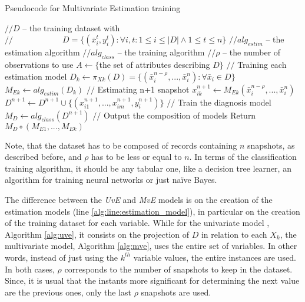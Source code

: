 \begin{algorithm}
	\caption{Pseudocode for Multivariate Estimation training}
	\label{alg:mve}
	\begin{algorithmic}[1]
		\State $// D$ – the training dataset with
		\State $// \qquad\qquad\qquad D = \{(\bar{x}_i^t,y_i^t ): \forall i,t:1 \leq i \leq |D| \wedge 1 \leq t \leq n\} $
		\State $// alg_{estim}$ – the estimation algorithm
		\State $// alg_{class}$ – the training algorithm
		\State $// \rho$ – the number of observations to use
		\State $A \leftarrow \{$the set of attributes describing $D\}$
		\Statex
		\State $//$ Training each estimation model
		\State $D_k \leftarrow \pi_{Xk} (D) = \{(\bar{x}_{i}^{n-\rho},...,\bar{x}_{i}^n ): \forall \bar{x}_i \in D\} $ \label{alg:line:estimation_model}
		\State $M_{Ek} \leftarrow alg_{estim}(D_k) $
		\EndFor
		\Statex
		\State $//$ Estimating n+1 snapshot
		\State $x_{ik}^{n+1} \leftarrow M_{Ek} (\bar{x}_{i}^{n-\rho},...,\bar{x}_{i}^n)$
		\State $ D^{n+1} \leftarrow D^{n+1} \cup \{(x_{i1}^{n+1},...,x_{im}^{n+1},y_i^{n+1} )\}$
		\EndFor
		\EndFor
		\Statex
		\State $//$ Train the diagnosis model
		\State $M_D \leftarrow  alg_{class}(D^{n+1})$
		\Statex
		\State $//$ Output the composition of models
		\State Return $M_D \circ (M_{E1},...,M_{Ek})$ \label{alg:line:return}
		\EndProcedure 
		\Statex
	\end{algorithmic}
\end{algorithm}

Note, that the dataset has to be composed of records containing $n$ snapshots, as described before, and $\rho$ has to be less or equal to $n$. 
In terms of the classification training algorithm, it should be any tabular one, like a decision tree learner, an algorithm for
 training neural networks or just naïve Bayes.

The difference between the \emph{UvE} and \emph{MvE} models is on the creation of the estimation models (line \ref{alg:line:estimation_model}), in particular on the creation of the training dataset for each variable. While for the univariate model , Algorithm \ref{alg:uve}, it consists on the projection of $D$ in relation to each $X_k$, the multivariate model, Algorithm \ref{alg:mve}, uses the entire set of variables. In other words, instead of just using the $k^{th}$ variable values, the entire instances are used. In both cases, $\rho$ corresponds to the number of snapshots to keep in the dataset.  Since, it is usual that the instants more significant for determining the next value are the previous ones, only the last $\rho$ snapshots are used.

